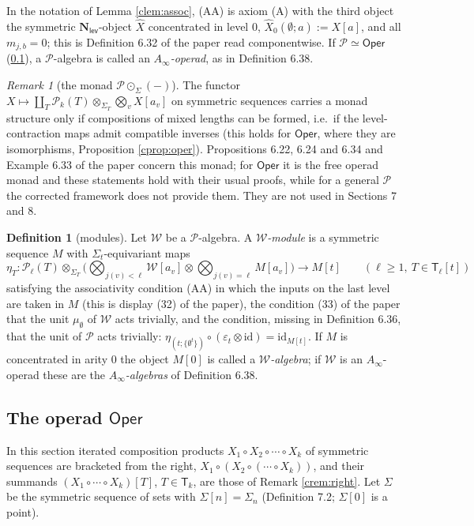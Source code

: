 \documentclass[12pt]{article}
\theoremstyle{plain}
\theoremstyle{definition}
\newtheorem{cdefinition}[ctheorem]{Definition}
\theoremstyle{remark}
\newtheorem{cremark}[ctheorem]{Remark}
\newcommand{\Cal}[1]{\mathcal{#1}}
\newcommand{\Nl}{\mathbf{N}_{\mathsf{lev}}}
\newcommand{\Oper}{\mathsf{Oper}}
\newcommand{\circdot}{\odot}
\newcommand{\id}{\mathrm{id}}
\newcommand{\Tr}{\mathsf{T}}
\begin{document}
In the notation of Lemma \ref{clem:assoc}, (AA) is axiom (A) with the third object the symmetric $\Nl$-object $\widehat X$ concentrated in level $0$, $\widehat X_0(\emptyset;a):=X[a]$, and all $m_{j,b}=0$; this is Definition 6.32 of the paper read componentwise. If $\Cal P\simeq\Oper$ (\ref{sec:corr:oper}), a $\Cal P$-algebra is called an \emph{$A_\infty$-operad}, as in Definition 6.38.

\begin{cremark}[the monad $\Cal P\circdot_\Sigma(-)$]\label{crem:monad}
The functor $X\mapsto\coprod_T\Cal P_k(T)\otimes_{\Sigma_T}\bigotimes_vX[a_v]$ on symmetric sequences carries a monad structure only if compositions of mixed lengths can be formed, i.e.\ if the level-contraction maps admit compatible inverses (this holds for $\Oper$, where they are isomorphisms, Proposition \ref{cprop:oper}). Propositions 6.22, 6.24 and 6.34 and Example 6.33 of the paper concern this monad; for $\Oper$ it is the free operad monad and these statements hold with their usual proofs, while for a general $\Cal P$ the corrected framework does not provide them. They are not used in Sections 7 and 8.
\end{cremark}

\begin{cdefinition}[modules]\label{cdef:module}
Let $\Cal W$ be a $\Cal P$-algebra. A \emph{$\Cal W$-module} is a symmetric sequence $M$ with $\Sigma_t$-equivariant maps
\[\eta_T\colon\Cal P_\ell(T)\otimes_{\Sigma_T}\Big(\bigotimes_{j(v)<\ell}\Cal W[a_v]\otimes\bigotimes_{j(v)=\ell}M[a_v]\Big)\longrightarrow M[t]\qquad(\ell\geq1,\ T\in\Tr_\ell[t])\]
satisfying the associativity condition (AA) in which the inputs on the last level are taken in $M$ (this is display (32) of the paper), the condition (33) of the paper that the unit $\mu_\emptyset$ of $\Cal W$ acts trivially, and the condition, missing in Definition 6.36, that the unit of $\Cal P$ acts trivially: $\eta_{(t;\{\emptyset^t\})}\circ(\varepsilon_t\otimes\id)=\id_{M[t]}$. If $M$ is concentrated in arity $0$ the object $M[0]$ is called a \emph{$\Cal W$-algebra}; if $\Cal W$ is an $A_\infty$-operad these are the \emph{$A_\infty$-algebras} of Definition 6.38.
\end{cdefinition}

\subsection{The operad $\Oper$}
\label{sec:corr:oper}

In this section iterated composition products $X_1\circ X_2\circ\cdots\circ X_k$ of symmetric sequences are bracketed from the right, $X_1\circ(X_2\circ(\cdots\circ X_k))$, and their summands $(X_1\circ\cdots\circ X_k)[T]$, $T\in\Tr_k$, are those of Remark \ref{crem:right}. Let $\Sigma$ be the symmetric sequence of sets with $\Sigma[n]=\Sigma_n$ (Definition 7.2; $\Sigma[0]$ is a point).
\end{document}
